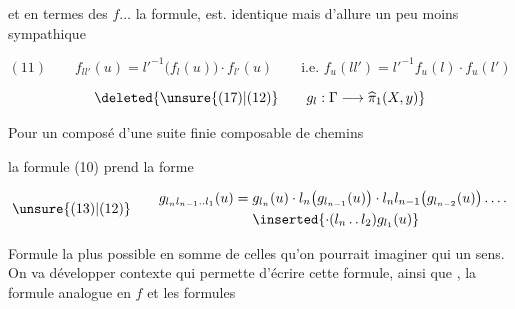 
et en termes des $f\ldots$ la formule, est. identique mais d'allure un peu moins sympathique

\[
(11)\qquad f_{ll'}(u)=l'^{-1}\bigl(f_l(u)\bigr)\cdot f_{l'}(u)
\qquad\text{i.e. }f_u(ll')=l'^{-1}f_u(l)\cdot f_u(l')
\]


\[
\deleted{\unsure{(17)|(12)}\qquad g_l:\Gamma\longrightarrow\widehat{\pi}_1(X,y)}
\]


Pour un composé d'une  suite finie composable de chemins


la formule (10) prend la forme

\[
\unsure{(13)|(12)}\qquad
\begin{aligned}
g_{l_nl_{n-1}\mathinner{\ldotp\ldotp}l_1}(u)={}&g_{l_n}(u)\cdot l_n\bigl(g_{l_{n-1}}(u)\bigr)\cdot l_nl_{n-1}\bigl(g_{l_{n-2}}(u)\bigr)\mathinner{\ldotp\ldotp\ldotp\ldotp}\\
&\hfill \inserted{\cdot(l_n\mathinner{\ldotp\ldotp}l_2)g_{l_1}(u)}
\end{aligned}
\]

Formule la plus   possible en somme de celles qu'on pourrait imaginer qui  un sens. On va développer   contexte qui permette  d'écrire cette formule, ainsi que , la formule analogue en $f$ et les formules

